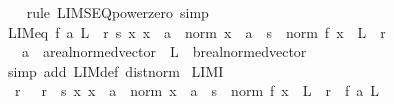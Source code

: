 \begin{isabellebody}
%
\isadelimproof
\ \ %
\endisadelimproof
%
\isatagproof
{}\isamarkupfalse%
\ {\isacharparenleft}{\kern0pt}rule\ LIMSEQ{\isacharunderscore}{\kern0pt}power{\isacharunderscore}{\kern0pt}zero{\isacharparenright}{\kern0pt}\ simp%
\endisatagproof
{\isafoldproof}%
%
\isadelimproof
%
\endisadelimproof
%
\isadelimdocument
%
\endisadelimdocument
%
\isatagdocument
%
\isamarkuptrue%
%
\endisatagdocument
{\isafolddocument}%
%
\isadelimdocument
%
\endisadelimdocument
{}\isamarkupfalse%
\ LIM{\isacharunderscore}{\kern0pt}eq{\isacharcolon}{\kern0pt}\ {\isachardoublequoteopen}f\ {\isasymmidarrow}a{\isasymrightarrow}\ L\ {\isacharequal}{\kern0pt}\ {\isacharparenleft}{\kern0pt}{\isasymforall}r{\isachargreater}{\kern0pt}{}{\isachardot}{\kern0pt}\ {\isasymexists}s{\isachargreater}{\kern0pt}{}{\isachardot}{\kern0pt}\ {\isasymforall}x{\isachardot}{\kern0pt}\ x\ {\isasymnoteq}\ a\ {\isasymand}\ norm\ {\isacharparenleft}{\kern0pt}x\ {\isacharminus}{\kern0pt}\ a{\isacharparenright}{\kern0pt}\ {\isacharless}{\kern0pt}\ s\ {\isasymlongrightarrow}\ norm\ {\isacharparenleft}{\kern0pt}f\ x\ {\isacharminus}{\kern0pt}\ L{\isacharparenright}{\kern0pt}\ {\isacharless}{\kern0pt}\ r{\isacharparenright}{\kern0pt}{\isachardoublequoteclose}\isanewline
\ \ \ a\ {\isacharcolon}{\kern0pt}{\isacharcolon}{\kern0pt}\ {\isachardoublequoteopen}{\isacharprime}{\kern0pt}a{\isacharcolon}{\kern0pt}{\isacharcolon}{\kern0pt}real{\isacharunderscore}{\kern0pt}normed{\isacharunderscore}{\kern0pt}vector{\isachardoublequoteclose}\ \ L\ {\isacharcolon}{\kern0pt}{\isacharcolon}{\kern0pt}\ {\isachardoublequoteopen}{\isacharprime}{\kern0pt}b{\isacharcolon}{\kern0pt}{\isacharcolon}{\kern0pt}real{\isacharunderscore}{\kern0pt}normed{\isacharunderscore}{\kern0pt}vector{\isachardoublequoteclose}\isanewline
%
\isadelimproof
\ \ %
\endisadelimproof
%
\isatagproof
{}\isamarkupfalse%
\ {\isacharparenleft}{\kern0pt}simp\ add{\isacharcolon}{\kern0pt}\ LIM{\isacharunderscore}{\kern0pt}def\ dist{\isacharunderscore}{\kern0pt}norm{\isacharparenright}{\kern0pt}%
\endisatagproof
{\isafoldproof}%
%
\isadelimproof
\isanewline
%
\endisadelimproof
\isanewline
{}\isamarkupfalse%
\ LIM{\isacharunderscore}{\kern0pt}I{\isacharcolon}{\kern0pt}\isanewline
\ \ {\isachardoublequoteopen}{\isacharparenleft}{\kern0pt}{\isasymAnd}r{\isachardot}{\kern0pt}\ {}\ {\isacharless}{\kern0pt}\ r\ {\isasymLongrightarrow}\ {\isasymexists}s{\isachargreater}{\kern0pt}{}{\isachardot}{\kern0pt}\ {\isasymforall}x{\isachardot}{\kern0pt}\ x\ {\isasymnoteq}\ a\ {\isasymand}\ norm\ {\isacharparenleft}{\kern0pt}x\ {\isacharminus}{\kern0pt}\ a{\isacharparenright}{\kern0pt}\ {\isacharless}{\kern0pt}\ s\ {\isasymlongrightarrow}\ norm\ {\isacharparenleft}{\kern0pt}f\ x\ {\isacharminus}{\kern0pt}\ L{\isacharparenright}{\kern0pt}\ {\isacharless}{\kern0pt}\ r{\isacharparenright}{\kern0pt}\ {\isasymLongrightarrow}\ f\ {\isasymmidarrow}a{\isasymrightarrow}\ L{\isachardoublequoteclose}\isanewline

\end{isabellebody}
